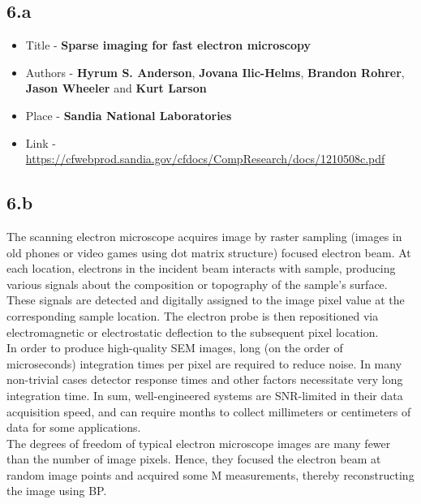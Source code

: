 \documentclass[12pt]{article}
\begin{document}
\subsection*{6.a}
\begin{itemize}
    \item Title - \textbf{Sparse imaging for fast electron microscopy}
    \item Authors - \textbf{Hyrum S. Anderson}, \textbf{ Jovana Ilic-Helms}, \textbf{Brandon Rohrer}, \textbf{Jason Wheeler} and \textbf{Kurt Larson}
    \item Place - \textbf{Sandia National Laboratories}
    \item Link - \href{https://cfwebprod.sandia.gov/cfdocs/CompResearch/docs/1210508c.pdf}{https://cfwebprod.sandia.gov/cfdocs/CompResearch/docs/1210508c.pdf}
\end{itemize}
\subsection*{6.b}
The scanning electron microscope acquires image by raster sampling (images in old phones or video games using dot matrix structure) focused electron beam. At each location, electrons in the incident beam interacts with sample, producing various signals about the composition or topography of the sample’s surface. These signals are  detected and digitally assigned to the image pixel value at the corresponding sample location. The electron probe is then repositioned via electromagnetic or electrostatic deflection to the subsequent pixel location.\\
In order to produce high-quality SEM images, long (on the order of microseconds) integration times per pixel are required to reduce noise. In many non-trivial cases detector response times and other factors necessitate very long integration time. In sum, well-engineered systems are SNR-limited in their data acquisition speed, and can require months to collect millimeters or centimeters of data for some applications.\\
The degrees of freedom of typical electron microscope images are many fewer than the number of image pixels. Hence, they focused the electron beam at random image points and acquired some M measurements, thereby reconstructing the image using BP.
\end{document}
